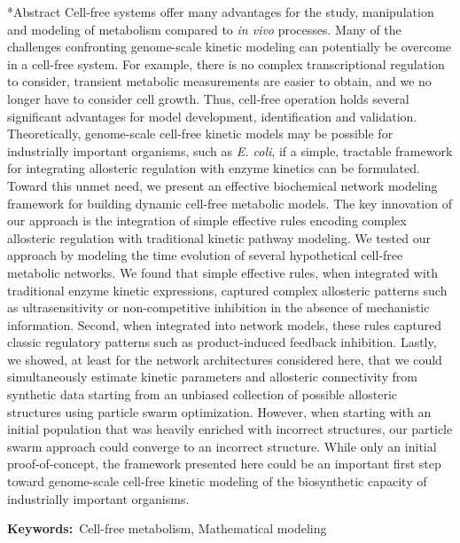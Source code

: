 \documentclass[12pt]{article}
\makeatletter
\renewcommand\section{\@startsection
	{subsection}{2}{0mm}
	{-0.2in}
	{0.05\baselineskip}
	{\normalfont\large\bfseries}}
\makeatother
\begin{document}
\section*{Abstract}
Cell-free systems offer many advantages for the study, manipulation and modeling of metabolism compared to \textit{in vivo} processes.
Many of the challenges confronting genome-scale kinetic modeling can potentially be overcome in a cell-free system. 
For example, there is no complex transcriptional regulation to consider, transient metabolic measurements are easier to obtain, and we no longer have to consider cell growth. 
Thus, cell-free operation holds several significant advantages for model development, identification and validation. 
Theoretically, genome-scale cell-free kinetic models may be possible for industrially important organisms, such as \textit{E. coli}, if a simple, tractable framework for integrating allosteric regulation with enzyme kinetics can be formulated. Toward this unmet need, we present an effective biochemical network modeling framework for building dynamic cell-free metabolic models.
The key innovation of our approach is the integration of simple effective rules encoding complex allosteric regulation with traditional kinetic pathway modeling. 
We tested our approach by modeling the time evolution of several hypothetical cell-free metabolic networks. 
We found that simple effective rules, when integrated with traditional enzyme kinetic expressions, captured complex allosteric patterns such as ultrasensitivity or non-competitive inhibition in the absence of mechanistic information. Second, when integrated into network models, these rules captured classic regulatory patterns such as product-induced feedback inhibition. 
Lastly, we showed, at least for the network architectures considered here, that we could simultaneously estimate kinetic parameters and allosteric connectivity from synthetic data 
starting from an unbiased collection of possible allosteric structures using particle swarm optimization. However, when starting with an initial population that was heavily enriched with incorrect structures, our particle swarm approach could converge to an incorrect structure. While only an initial proof-of-concept, the framework presented here could be an important first step toward genome-scale cell-free kinetic modeling of the biosynthetic capacity of industrially important organisms.

{\noindent \textbf{Keywords:}~Cell-free metabolism, Mathematical modeling}

\pagebreak
\end{document}
